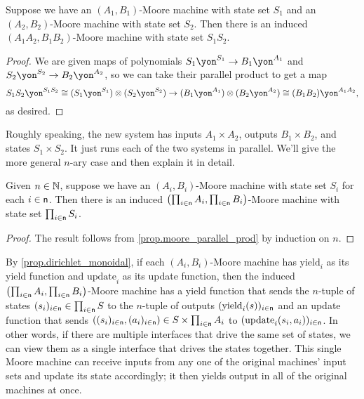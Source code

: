 \documentclass[Book-Poly]{subfiles}
\begin{document}
\begin{proposition} \label{prop.moore_parallel_prod}
Suppose we have an $(A_1,B_1)$-Moore machine with state set $S_1$ and an $(A_2,B_2)$-Moore machine with state set $S_2$. Then there is an induced $(A_1 A_2,B_1 B_2)$-Moore machine with state set $S_1 S_2$.
\end{proposition}
\begin{proof}
We are given maps of polynomials $S_1\yon^{S_1}\to B_1\yon^{A_1}$ and $S_2\yon^{S_2}\to B_2\yon^{A_2}$, so we can take their parallel product to get a map
\[
  S_1 S_2\yon^{S_1 S_2} \cong (S_1 \yon^{S_1}) \otimes (S_2 \yon^{S_2}) \to
  (B_1\yon^{A_1})\otimes(B_2\yon^{A_2})
  \cong(B_1 B_2)\yon^{A_1 A_2},
\] 
as desired.
\end{proof}

Roughly speaking, the new system has inputs $A_1\times A_2$, outputs $B_1\times B_2$, and states $S_1\times S_2$. It just runs each of the two systems in parallel. We'll give the more general $n$-ary case and then explain it in detail.

\begin{corollary}
Given $n \in \mathbb{N}$, suppose we have an $(A_i,B_i)$-Moore machine with state set $S_i$ for each $i \in \mathsf{n}$. Then there is an induced $\left(\prod_{i \in \mathsf{n}} A_i, \prod_{i \in \mathsf{n}} B_i\right)$-Moore machine with state set $\prod_{i \in \mathsf{n}} S_i$.
\end{corollary}
\begin{proof}
The result follows from \cref{prop.moore_parallel_prod} by induction on $n$.
\end{proof}

By \cref{prop.dirichlet_monoidal}, if each $(A_i,B_i)$-Moore machine has $\text{yield}_i$ as its yield function and $\text{update}_i$ as its update function, then the induced $\left(\prod_{i \in \mathsf{n}} A_i, \prod_{i \in \mathsf{n}} B_i\right)$-Moore machine has a yield function that sends the $n$-tuple of states $(s_i)_{i \in \mathsf{n}} \in \prod_{i \in \mathsf{n}} S$ to the $n$-tuple of outputs $(\text{yield}_i(s))_{i \in \mathsf{n}}$ and an update function that sends $((s_i)_{i \in \mathsf{n}}, (a_i)_{i \in \mathsf{n}}) \in S \times \prod_{i \in \mathsf{n}} A_i$ to $(\text{update}_i(s_i, a_i))_{i \in \mathsf{n}}$.
In other words, if there are multiple interfaces that drive the same set of states, we can view them as a single interface that drives the states together.
This single Moore machine can receive inputs from any one of the original machines' input sets and update its state accordingly; it then yields output in all of the original machines at once.
\end{document}
